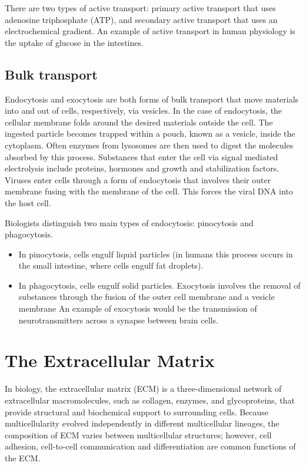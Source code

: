 There are two types of active transport: primary active transport that uses adenosine triphosphate (ATP), and secondary active transport that uses an electrochemical gradient. An example of active transport in human physiology is the uptake of glucose in the intestines.

\hypertarget{bulk-transport}{%
\subsection{Bulk transport}\label{bulk-transport}}

Endocytosis and exocytosis are both forms of bulk transport that move materials into and out of cells, respectively, via vesicles. In the case of endocytosis, the cellular membrane folds around the desired materials outside the cell. The ingested particle becomes trapped within a pouch, known as a vesicle, inside the cytoplasm. Often enzymes from lysosomes are then used to digest the molecules absorbed by this process. Substances that enter the cell via signal mediated electrolysis include proteins, hormones and growth and stabilization factors. Viruses enter cells through a form of endocytosis that involves their outer membrane fusing with the membrane of the cell. This forces the viral DNA into the host cell.

Biologists distinguish two main types of endocytosis: pinocytosis and phagocytosis.

\begin{itemize}
\tightlist
\item
  In pinocytosis, cells engulf liquid particles (in humans this process occurs in the small intestine, where cells engulf fat droplets).
\item
  In phagocytosis, cells engulf solid particles.
  Exocytosis involves the removal of substances through the fusion of the outer cell membrane and a vesicle membrane An example of exocytosis would be the transmission of neurotransmitters across a synapse between brain cells.
\end{itemize}

\hypertarget{the-extracellular-matrix}{%
\section{The Extracellular Matrix}\label{the-extracellular-matrix}}

In biology, the extracellular matrix (ECM) is a three-dimensional network of extracellular macromolecules, such as collagen, enzymes, and glycoproteins, that provide structural and biochemical support to surrounding cells. Because multicellularity evolved independently in different multicellular lineages, the composition of ECM varies between multicellular structures; however, cell adhesion, cell-to-cell communication and differentiation are common functions of the ECM.

